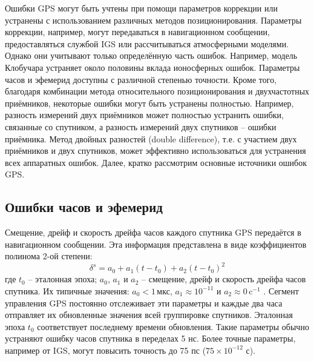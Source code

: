 Ошибки GPS могут быть учтены при помощи параметров коррекции или устранены с использованием различных методов позиционирования.
Параметры коррекции, например, могут передаваться в навигационном сообщении, предоставляться службой IGS или рассчитываться атмосферными моделями.
Однако они учитывают только определённую часть ошибок.
Например, модель Клобучара устраняет около половины вклада ионосферных ошибок. 
Параметры часов и эфемерид доступны с различной степенью точности.
Кроме того, благодаря комбинации метода относительного позиционирования и двухчастотных приёмников, некоторые ошибки могут быть устранены полностью.
Например, разность измерений двух приёмников может полностью устранить ошибки, связанные со спутником, а разность измерений двух спутников -- ошибки приёмника.
Метод двойных разностей (double difference), т.е. с участием двух приёмников и двух спутников, может эффективно использоваться для устранения всех аппаратных ошибок.
Далее, кратко рассмотрим основные источники ошибок GPS.

\subsection*{\textbf{Ошибки часов и эфемерид}}

Смещение, дрейф и скорость дрейфа часов каждого спутника GPS передаётся в навигационном сообщении.
Эта информация представлена в виде коэффициентов полинома 2-ой степени:
\begin{equation}
\delta^s=a_0+a_1(t-t_0)+a_2(t-t_0)^2
\end{equation}
где 
$t_0$ -- эталонная эпоха; 
$a_0$, $a_1$ и $a_2$ -- смещение, дрейф и скорость дрейфа часов спутника.
Их типичные значения: $a_0<1\,\text{мкс}$, $a_1\approx10^{-11}$ и $a_2\approx0\,\text{c}^{-1}$ \cite{Seeber2003}.
Сегмент управления GPS постоянно отслеживает эти параметры и каждые два часа отправляет их обновленные значения всей группировке спутников. 
Эталонная эпоха $t_0$ соответствует последнему времени обновления. 
Такие параметры обычно устраняют ошибку часов спутника в переделах 5 нс.
Более точные параметры, например от IGS, могут повысить точность до 75 пс ($75\times10^{-12}$ с).

